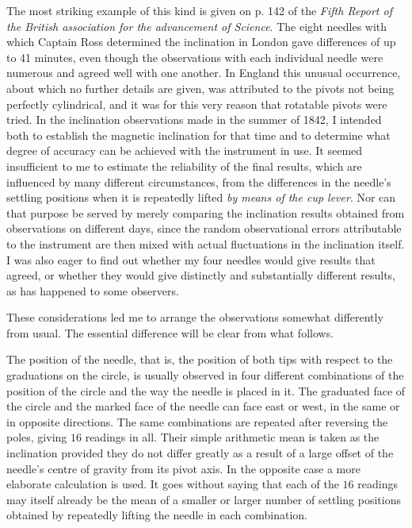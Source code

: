 \expandafter\def\csname HistoricalNoteText457\endcsname{The most striking example of this kind is given on p. 142 of the \textit{Fifth Report of the British association for the advancement of Science}. The eight needles with which Captain Ross determined the inclination in London gave differences of up to 41 minutes, even though the observations with each individual needle were numerous and agreed well with one another. In England this unusual occurrence, about which no further details are given, was attributed to the pivots not being perfectly cylindrical, and it was for this very reason that rotatable pivots were tried.}%
In the inclination observations made in the summer of 1842, I in\-tended both to establish the magnetic inclination for that time and to determine what degree of accuracy can be achieved with the instrument in use. It seemed insufficient to me to estimate the reliability of the final results, which are influenced by many different circumstances, from the differences in the needle's settling positions when it is repeatedly lifted \textit{by means of the cup lever}. Nor can that purpose be served by merely comparing the inclination results obtained from observations on different days, since the random observational errors attributable to the instrument are then mixed with actual fluctuations in the inclination itself. I was also eager to find out whether my four needles would give results that agreed, or whether they would give distinctly and substantially different results, as has happened to some observers.

These considerations led me to arrange the observations somewhat differently from usual. The essential difference will be clear from what follows.

The position of the needle, that is, the position of both tips with respect to the graduations on the circle, is usually observed in four different combinations of the position of the circle and the way the needle is placed in it. The graduated face of the circle and the marked face of the needle can face east or west, in the same or in opposite directions. The same combinations are repeated after reversing the poles, giving $16$ readings in all. Their simple arithmetic mean is taken as the inclination provided they do not differ greatly as a result of a large offset of the needle's centre of gravity from its pivot axis. In the opposite case a more elaborate calculation is used. It goes without saying that each of the $16$ readings
may itself already be the mean of a smaller or larger number of settling positions obtained by repeatedly lifting the needle in each combination.

